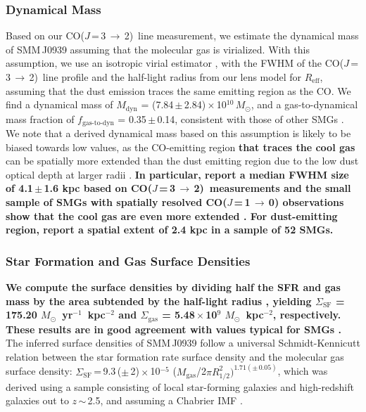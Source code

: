 \documentclass[iop]{emulateapj}
\newcommand{\Msun}{\mbox{$M_{\odot}$}}
\newcommand{\rarr}{$\rightarrow$}
\newcommand{\CO}{\mbox{CO($J$\,=\,3\,$\rightarrow$\,2) }}
\newcommand{\rot}[3][CO]{\mbox{#1($J$\,=\,#2\,\rarr\,#3)}}
\newcommand{\eg}{{\sl e.g.,~}}
\newcommand{\pmOne}{\mbox{$^{-1}$}}
\begin{document}
\subsubsection{Dynamical Mass}
Based on our \CO line measurement, we estimate the dynamical mass of SMM\,J0939 assuming that the molecular gas is virialized. With this assumption, we use an isotropic virial estimator \citep[\eg][]{Engel10a}, with the FWHM of the \CO line profile and the half-light radius from our lens model for $R_\textrm{eff}$, assuming that the dust emission traces the same emitting region as the CO. 
We find a dynamical mass of $M_\textrm{dyn}$ = (7.84\,$\pm$\,2.84)\,$\times$\,10$^{10}$\,\Msun, and a gas-to-dynamical mass fraction of $f_\textrm{gas-to-dyn}$ = 0.35\,$\pm$\,0.14, consistent with those of other SMGs \citep{Tacconi06a}.  We note that a derived dynamical mass based on this assumption is likely to be biased towards low values, as the CO-emitting region {\bf that traces the cool gas} can be spatially more extended than the dust emitting region due to the low dust optical depth at larger radii \citep[\eg][]{Tacconi06a, Riechers11c,Riechers11d,Ivison11a}. 
{\bf In particular, \citet{Tacconi06a} report a median FWHM size of 4.1\,$\pm$\,1.6 kpc based on \CO measurements and 
the small sample of SMGs with spatially resolved \rot{1}{0} observations show that the cool gas are even more extended \citep{Ivison11a, Riechers11c, Hodge13a}. For dust-emitting region, \citet{Simpson15a} report a spatial extent of 2.4 kpc in a sample of 52 SMGs.
 }

\subsubsection{Star Formation and Gas Surface Densities}
{\bf We compute the surface densities by dividing half the SFR and gas mass by the area subtended by the half-light
radius \citep[\eg][]{Genzel10a, Harrison15a}, yielding 
$\Sigma_\textrm{SF}$ = 175.20 \Msun~yr\pmOne~kpc$^{-2}$ and $\Sigma_\textrm{gas}$ = 5.48\,$\times$\,10$^9$ \Msun~kpc$^{-2}$, respectively. 
These results are in good agreement with values typical for SMGs \citep{Tacconi08a}. }
The inferred surface densities of SMM\,J0939 follow a universal Schmidt-Kennicutt relation between the star formation rate
surface density and the molecular gas surface density: $\Sigma_\textrm{SF}$\,=\,9.3\,($\pm$\,2)\,$\times$\,10$^{-5}$ ($M_\textrm{gas}$/2$\pi R_\textrm{1/2}^2)^{1.71(\pm\,0.05)}$, which was derived using a sample consisting of local star-forming galaxies and high-redshift
galaxies
out to $z$\,$\sim$\,2.5, and assuming a Chabrier IMF \citep{B07a}.
\end{document}
